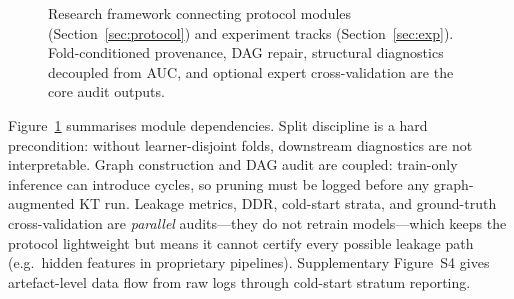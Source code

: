 \documentclass[preprint,10pt,doubleblind]{elsarticle}
\newcommand{\DDR}{\textsc{DDR}}
\begin{document}
\begin{figure}[!t]
\centering
{}
\caption{Research framework connecting protocol modules (Section~\ref{sec:protocol})
and experiment tracks (Section~\ref{sec:exp}). Fold-conditioned provenance,
DAG repair, structural diagnostics decoupled from AUC, and optional expert
cross-validation are the core audit outputs.}
\label{fig:framework}
\end{figure}

Figure~\ref{fig:framework} summarises module dependencies. Split
discipline is a hard precondition: without learner-disjoint folds,
downstream diagnostics are not interpretable. Graph construction and DAG
audit are coupled: train-only inference can introduce cycles, so pruning
must be logged before any graph-augmented KT run. Leakage metrics,
\DDR{}, cold-start strata, and ground-truth cross-validation are
\emph{parallel} audits---they do not retrain models---which keeps the
protocol lightweight but means it cannot certify every possible leakage
path (e.g.\ hidden features in proprietary pipelines).
Supplementary Figure~S4 gives artefact-level data
flow from raw logs through cold-start stratum reporting.
\end{document}
